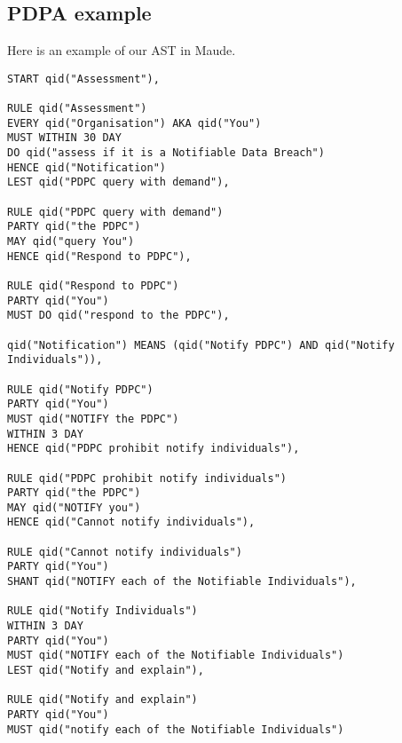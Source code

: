 \documentclass{article}
\begin{document}
\subsection{PDPA example}

Here is an example of our AST in Maude.

\begin{lstlisting}
START qid("Assessment"),

RULE qid("Assessment")
EVERY qid("Organisation") AKA qid("You")
MUST WITHIN 30 DAY
DO qid("assess if it is a Notifiable Data Breach")
HENCE qid("Notification")
LEST qid("PDPC query with demand"),

RULE qid("PDPC query with demand")
PARTY qid("the PDPC")
MAY qid("query You")
HENCE qid("Respond to PDPC"),

RULE qid("Respond to PDPC")
PARTY qid("You")
MUST DO qid("respond to the PDPC"),

qid("Notification") MEANS (qid("Notify PDPC") AND qid("Notify Individuals")),

RULE qid("Notify PDPC")
PARTY qid("You")
MUST qid("NOTIFY the PDPC")
WITHIN 3 DAY
HENCE qid("PDPC prohibit notify individuals"),

RULE qid("PDPC prohibit notify individuals")
PARTY qid("the PDPC")
MAY qid("NOTIFY you")
HENCE qid("Cannot notify individuals"),

RULE qid("Cannot notify individuals")
PARTY qid("You")
SHANT qid("NOTIFY each of the Notifiable Individuals"),

RULE qid("Notify Individuals")
WITHIN 3 DAY
PARTY qid("You")
MUST qid("NOTIFY each of the Notifiable Individuals")
LEST qid("Notify and explain"),

RULE qid("Notify and explain")
PARTY qid("You")
MUST qid("notify each of the Notifiable Individuals")

\end{lstlisting}
\end{document}
